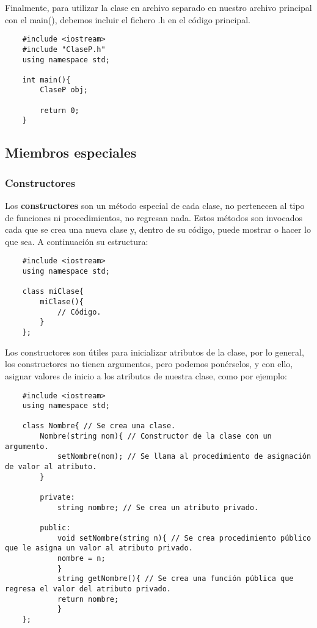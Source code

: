 Finalmente, para utilizar la clase en archivo separado en nuestro archivo principal con el main(), debemos incluir el fichero .h en el código principal.
\begin{lstlisting}
    #include <iostream>
    #include "ClaseP.h"
    using namespace std;
    
    int main(){
        ClaseP obj;
        
        return 0;
    }
\end{lstlisting}


\subsection{Miembros especiales}


\subsubsection{Constructores}

Los \textbf{constructores} son un método especial de cada clase, no pertenecen al tipo de funciones ni procedimientos, no regresan nada. Estos métodos son invocados cada que se crea una nueva clase y, dentro de su código, puede mostrar o hacer lo que sea. A continuación su estructura:
\begin{lstlisting}
    #include <iostream>
    using namespace std;
    
    class miClase{
        miClase(){
            // Código.
        }
    };
\end{lstlisting}

Los constructores son útiles para inicializar atributos de la clase, por lo general, los constructores no tienen argumentos, pero podemos ponérselos, y con ello, asignar valores de inicio a los atributos de nuestra clase, como por ejemplo:
\begin{lstlisting}
    #include <iostream>
    using namespace std;

    class Nombre{ // Se crea una clase.
        Nombre(string nom){ // Constructor de la clase con un argumento.
            setNombre(nom); // Se llama al procedimiento de asignación de valor al atributo.
        }
        
        private:
            string nombre; // Se crea un atributo privado.
        
        public:
            void setNombre(string n){ // Se crea procedimiento público que le asigna un valor al atributo privado.
            nombre = n;
            }
            string getNombre(){ // Se crea una función pública que regresa el valor del atributo privado.
            return nombre;
            }
    };
\end{lstlisting}


